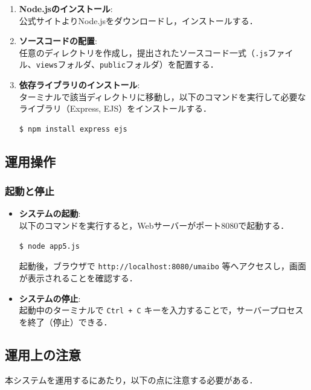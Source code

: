 \documentclass[uplatex,dvipdfmx]{jsarticle}
\begin{document}
\begin{enumerate}
    \item \textbf{Node.jsのインストール}: \\
    公式サイトよりNode.jsをダウンロードし，インストールする．
    
    \item \textbf{ソースコードの配置}: \\
    任意のディレクトリを作成し，提出されたソースコード一式（\texttt{.js}ファイル、\texttt{views}フォルダ、\texttt{public}フォルダ）を配置する．
    
    \item \textbf{依存ライブラリのインストール}: \\
    ターミナルで該当ディレクトリに移動し，以下のコマンドを実行して必要なライブラリ（Express, EJS）をインストールする．
\begin{verbatim}
$ npm install express ejs
\end{verbatim}
\end{enumerate}

\subsection{運用操作}
\subsubsection{起動と停止}
\begin{itemize}
    \item \textbf{システムの起動}: \\
    以下のコマンドを実行すると，Webサーバーがポート8080で起動する．
\begin{verbatim}
$ node app5.js
\end{verbatim}
    起動後，ブラウザで \texttt{http://localhost:8080/umaibo} 等へアクセスし，画面が表示されることを確認する．

    \item \textbf{システムの停止}: \\
    起動中のターミナルで \texttt{Ctrl + C} キーを入力することで，サーバープロセスを終了（停止）できる．
\end{itemize}

\subsection{運用上の注意}
本システムを運用するにあたり，以下の点に注意する必要がある．
\end{document}
